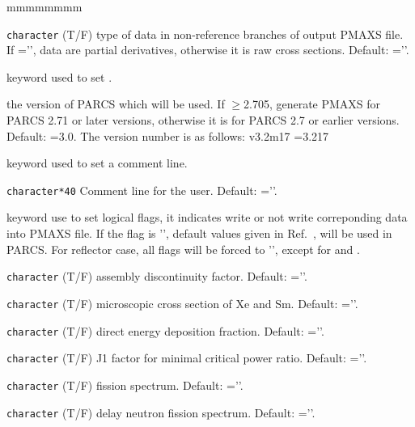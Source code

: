 \begin{ListeDeDescription}{mmmmmmmm}
\item[\dusa{der}] \texttt{character} (T/F) type of data in non-reference branches of output PMAXS file. If ='', data are partial derivatives, otherwise it is raw cross sections. Default: =''.

\item[\moc{VERSION}]   keyword used to set .

\item[\dusa{vers}] the version of PARCS which will be used. If $\geq$2.705, generate PMAXS for PARCS 2.71 or later versions, otherwise it is for PARCS 2.7 or earlier versions. Default: =3.0. The version number is as follows: v3.2m17 =3.217

\item[\moc{COMMENT}]   keyword used to set a comment line.

\item[\dusa{comment}] \texttt{character*40} Comment line for the user. Default: =''.

\item[\moc{JOB$\_$OPT}]   keyword use to set logical flags, it indicates write or not write correponding data into PMAXS file. If the flag is '', default values given in Ref.~, will be used in PARCS. For reflector case, all flags will be forced to '', except for  and .

\item[\dusa{ladf}] \texttt{character} (T/F) assembly discontinuity factor. Default: =''.

\item[\dusa{lxes}] \texttt{character} (T/F) microscopic cross section of Xe and Sm. Default: =''.

\item[\dusa{lded}] \texttt{character} (T/F) direct energy deposition fraction. Default: =''.

\item[\dusa{lj1f}] \texttt{character} (T/F) J1 factor for minimal critical power ratio. Default: =''.

\item[\dusa{lchi}] \texttt{character} (T/F) fission spectrum. Default: =''.

\item[\dusa{lchid}] \texttt{character} (T/F) delay neutron fission spectrum. Default: =''.


\end{ListeDeDescription}

